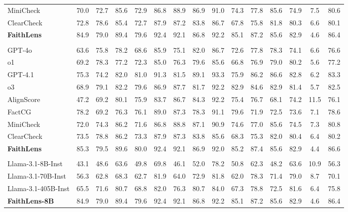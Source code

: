 \begin{table}[!t]
{\begin{tabular}{lcccccccccccccc}
MiniCheck & 70.0 &72.7 &85.6 &72.9 &86.8 &88.9 &86.9 &91.0 &74.3 &77.8 &85.6 &74.9& 7.5 &80.6 \\
ClearCheck & 72.8 &78.6 &85.4 &72.7 &87.9 &87.2 &83.8 &86.7 &67.8 &75.8& 81.8 &80.3 &6.6 &80.1  \\
\rowcolor{blue!5} \textbf{FaithLens} & {84.9}& {79.0} &{89.4} & {79.6} &{92.4} &{92.1} &{86.8} &{92.2} &{85.1} & {87.2} &{85.6} & {82.9} & {4.6} &{86.4}  \\
\midrule
\rowcolor{mypink} \multicolumn{15}{c}{\cellcolor{mypink} \textbf{Claim Decomposition Study}} \\
GPT-4o & 63.6 &75.8 &78.2 &68.6 &85.9 &75.1 &82.0 &86.7 &72.6 &77.8 &78.3 &74.1 &6.6 &76.6  \\
o1 & 69.2 &78.3 &77.2 &72.3 &85.0 &76.3 &79.6 &85.6 &66.8 &76.9 &79.0 &80.2 &5.6 &77.2  \\
GPT-4.1 & 75.3 &74.2 &82.0& 81.0 &91.3 &81.5 &89.1 &93.3 &75.9 &86.2 &86.6 &82.8 &6.2 &83.3  \\
o3 &  68.9 &79.1 &82.2 &79.6& 86.9 &87.7 &81.7 &92.2 &82.9 &84.6 &82.9 &81.4& 5.7 &82.5  \\
\hdashline[2pt/3pt]
AlignScore &  47.2& 69.2& 80.1 &75.9 &83.7& 86.7 &84.3 &92.2 &75.4 &76.7 &68.1 &74.2 &11.5 &76.1  \\
FactCG & 78.2 &69.2 &76.3 &76.1 &89.0 &87.3& 78.3 &91.1 &79.6 &71.9 &72.5 &73.6 &7.1 &78.6  \\
MiniCheck & 72.0 &74.3 &86.2 &71.6 &86.8 &88.8 &87.1 &90.9 &74.6 &77.0 &85.6 &74.5 &7.3 &80.8  \\
ClearCheck & 73.5 &78.8 &86.2& 73.3 &87.9 &87.3 &83.8 &85.6 &68.3 &75.3 &82.0 &80.4& 6.4 &80.2  \\
\rowcolor{blue!5} \textbf{FaithLens}& {85.3} &{79.5} & {89.6} &{80.0} & {92.4} & {92.1} &{86.9} &{92.0} & {85.2} &{87.4} &{85.6} & {82.9} &{4.4} &{86.6}  \\
\midrule
\rowcolor{mypink} \multicolumn{15}{c}{\cellcolor{mypink} \textbf{Generalization Study}} \\
Llama-3.1-8B-Inst & 43.1&48.6&63.6&49.8&69.8&46.1&52.0&78.2&50.8&62.3&48.2&63.6&10.9 &56.3  \\
Llama-3.1-70B-Inst & 56.3&62.8&68.3&62.7&81.9&64.0&72.9&81.8&62.0&78.3&71.4&79.0&8.7 &70.1  \\
Llama-3.1-405B-Inst &65.5&71.6&80.7&68.8&82.0&76.3&80.7&84.0&67.3&78.8&72.5&81.6&6.4 &75.8  \\
\rowcolor{blue!5} \textbf{FaithLens-8B}& {84.9}&{79.0}&{89.4}&{79.6}&{92.4}&{92.1}&{86.8}&{92.2}&{85.1}&{87.2}&{85.6}&{82.9}&{4.6} &{86.4} \\

\end{tabular}}
\end{table}
